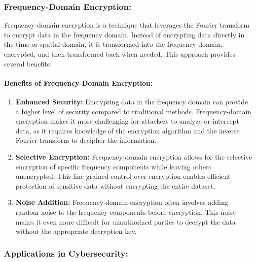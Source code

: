 \documentclass[11pt]{article}
\begin{document}
\hypertarget{frequency-domain-encryption}{%
\subsubsection{\texorpdfstring{\textbf{Frequency-Domain
Encryption:}}{Frequency-Domain Encryption:}}\label{frequency-domain-encryption}}

Frequency-domain encryption is a technique that leverages the Fourier
transform to encrypt data in the frequency domain. Instead of encrypting
data directly in the time or spatial domain, it is transformed into the
frequency domain, encrypted, and then transformed back when needed. This
approach provides several benefits:

\hypertarget{benefits-of-frequency-domain-encryption}{%
\paragraph{\texorpdfstring{\textbf{Benefits of Frequency-Domain
Encryption:}}{Benefits of Frequency-Domain Encryption:}}\label{benefits-of-frequency-domain-encryption}}

\begin{enumerate}
\def\labelenumi{\arabic{enumi}.}
\item
  \textbf{Enhanced Security:} Encrypting data in the frequency domain
  can provide a higher level of security compared to traditional
  methods. Frequency-domain encryption makes it more challenging for
  attackers to analyze or intercept data, as it requires knowledge of
  the encryption algorithm and the inverse Fourier transform to decipher
  the information.
\item
  \textbf{Selective Encryption:} Frequency-domain encryption allows for
  the selective encryption of specific frequency components while
  leaving others unencrypted. This fine-grained control over encryption
  enables efficient protection of sensitive data without encrypting the
  entire dataset.
\item
  \textbf{Noise Addition:} Frequency-domain encryption often involves
  adding random noise to the frequency components before encryption.
  This noise makes it even more difficult for unauthorized parties to
  decrypt the data without the appropriate decryption key.
\end{enumerate}

\hypertarget{applications-in-cybersecurity}{%
\subsubsection{\texorpdfstring{\textbf{Applications in
Cybersecurity:}}{Applications in Cybersecurity:}}\label{applications-in-cybersecurity}}
\end{document}
